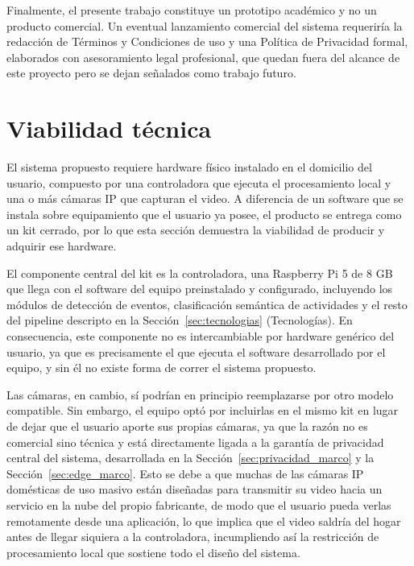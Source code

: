 Finalmente, el presente trabajo constituye un prototipo académico y no un producto comercial.
Un eventual lanzamiento comercial del sistema requeriría la redacción de Términos y Condiciones de uso y una Política de Privacidad formal, elaborados con asesoramiento legal profesional, que quedan fuera del alcance de este proyecto pero se dejan señalados como trabajo futuro.

\section{Viabilidad técnica}
\label{sec:viabilidad-tecnica}

El sistema propuesto requiere hardware físico instalado en el domicilio del usuario, compuesto por una controladora que ejecuta el procesamiento local y una o más cámaras IP que capturan el video.
A diferencia de un software que se instala sobre equipamiento que el usuario ya posee, el producto se entrega como un kit cerrado, por lo que esta sección demuestra la viabilidad de producir y adquirir ese hardware.

El componente central del kit es la controladora, una Raspberry Pi 5 de 8 GB que llega con el software del equipo preinstalado y configurado, incluyendo los módulos de detección de eventos, clasificación semántica de actividades y el resto del pipeline descripto en la Sección~\ref{sec:tecnologias} (Tecnologías).
En consecuencia, este componente no es intercambiable por hardware genérico del usuario, ya que es precisamente el que ejecuta el software desarrollado por el equipo, y sin él no existe forma de correr el sistema propuesto.

Las cámaras, en cambio, sí podrían en principio reemplazarse por otro modelo compatible.
Sin embargo, el equipo optó por incluirlas en el mismo kit en lugar de dejar que el usuario aporte sus propias cámaras, ya que la razón no es comercial sino técnica y está directamente ligada a la garantía de privacidad central del sistema, desarrollada en la Sección~\ref{sec:privacidad_marco} y la Sección~\ref{sec:edge_marco}.
Esto se debe a que muchas de las cámaras IP domésticas de uso masivo están diseñadas para transmitir su video hacia un servicio en la nube del propio fabricante, de modo que el usuario pueda verlas remotamente desde una aplicación, lo que implica que el video saldría del hogar antes de llegar siquiera a la controladora, incumpliendo así la restricción de procesamiento local que sostiene todo el diseño del sistema.

